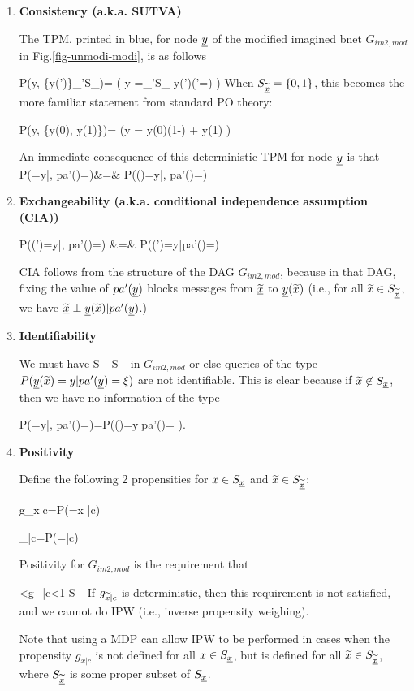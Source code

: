 \begin{enumerate}


\item {\bf Consistency (a.k.a. SUTVA)}

The TPM, printed in  blue, for node ${\underline{y}}$
of the modified imagined bnet $G_{im2,mod}$ in Fig.\ref{fig-unmodi-modi},
 is as follows

\beq \color{blue}
P(y\cond \tilx, \{y(\tilx')\}_{\tilx'\in S_{\ul{\tilx}}})=
\indi(
\quad y =\sum_{\tilx'\in S_{\ul{\tilx}}}
 y(\tilx')\indi(\tilx'=\tilx)
 \quad)
\eeq
When $S_{\underline{{\widetilde{x}}}}=\{0,1\}$,
this becomes the more familiar 
statement from standard 
PO theory:

\beq \color{blue}
P(y\cond \tilx, \{y(0), y(1)\})=
\indi(\quad y =
y(0)(1-\tilx)
+ 
y(1)\tilx
\quad)
\eeq

An immediate consequence
of this deterministic TPM for
node ${\underline{y}}$ is that
\beqa
P(\rvy=y|\tilx, pa'(\rvy)=\xi)&=&
P(\rvy(\tilx)=y|\tilx, pa'(\rvy)=\xi)
\eeqa


\item {\bf Exchangeability (a.k.a.
conditional independence assumption (CIA))}

\beqa
P(\rvy(\tilx')=y|\tilx, pa'(\rvy)=\xi)
&=&
P(\rvy(\tilx')=y|pa'(\rvy)=\xi)
\eeqa

CIA follows from the structure
of the DAG $G_{im2,mod}$,
because in that
DAG, fixing the value
of $pa'({\underline{y}})$
blocks messages from $\underline{{\widetilde{x}}}$
to ${\underline{y}}({\widetilde{x}})$ (i.e.,
for all ${\widetilde{x}}\in S_{\underline{{\widetilde{x}}}}$,
we have  
$\underline{{\widetilde{x}}}
\perp {\underline{y}}({\widetilde{x}})|pa'({\underline{y}})$.)

\item {\bf Identifiability}

We must have
\beq
S_{\ul{\tilx}} \subset S_\rvx
\eeq
in $G_{im2, mod}$
or else queries of the type
 $P({\underline{y}}({\widetilde{x}})=y|pa'({\underline{y}})=\xi)$ are not identifiable.
This is clear because if ${\widetilde{x}}\not\in S_{\underline{x}}$,
then we have no information of the type

\beq
P(\rvy=y|\tilx, pa'(\rvy)=\xi)=P(\rvy(\tilx)=y|pa'(\rvy)=\xi
)\;.
\eeq

\item{\bf Positivity}

Define the following 2 propensities
for $x\in S_{\underline{x}}$ and ${\widetilde{x}} \in S_{\underline{{\widetilde{x}}}}$:

\beq
g_{x|c}=P(\rvx=x |c)
\eeq

\beq
\tilg_{\tilx|c}=P(\ul{\tilx}=\tilx |c)
\eeq

Positivity for  $G_{im2,mod}$
is the requirement that

<g_{\tilx|c}<1  \tilx \in S_{\ul{\tilx}}
\eeq
If $g_{{\widetilde{x}}|c}$
is deterministic, then this requirement
is not satisfied, and we cannot do IPW (i.e.,
inverse propensity weighing).

Note that using a MDP can allow IPW to
be performed  in cases
when the propensity $g_{x|c}$
is not defined for all $x\in S_{\underline{x}}$, but is defined
for all ${\widetilde{x}}\in S_{\underline{{\widetilde{x}}}}$, where
$S_{\underline{{\widetilde{x}}}}$
is some proper subset of $S_{\underline{x}}$.

\end{enumerate}

